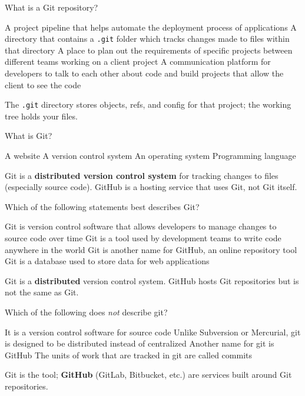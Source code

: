 \question[4]
What is a Git repository?
\begin{choices}
  \choice A project pipeline that helps automate the deployment process of applications
  \CorrectChoice A directory that contains a \texttt{.git} folder which tracks changes made to files within that directory
  \choice A place to plan out the requirements of specific projects between different teams working on a client project
  \choice A communication platform for developers to talk to each other about code and build projects that allow the client to see the code
\end{choices}
\begin{solution}
  The \texttt{.git} directory stores objects, refs, and config for that project; the working tree holds your files.
\end{solution}

\question[4]
What is Git?
\begin{choices}
  \choice A website
  \CorrectChoice A version control system
  \choice An operating system
  \choice Programming language
\end{choices}
\begin{solution}
  Git is a \textbf{distributed version control system} for tracking changes to files (especially source code). GitHub is a hosting service that uses Git, not Git itself.
\end{solution}

\question[4]
Which of the following statements best describes Git?
\begin{choices}
  \CorrectChoice Git is version control software that allows developers to manage changes to source code over time
  \choice Git is a tool used by development teams to write code anywhere in the world
  \choice Git is another name for GitHub, an online repository tool
  \choice Git is a database used to store data for web applications
\end{choices}
\begin{solution}
  Git is a \textbf{distributed} version control system. GitHub hosts Git repositories but is not the same as Git.
\end{solution}

\question[4]
Which of the following does \emph{not} describe git?
\begin{choices}
  \choice It is a version control software for source code
  \choice Unlike Subversion or Mercurial, git is designed to be distributed instead of centralized
  \CorrectChoice Another name for git is GitHub
  \choice The units of work that are tracked in git are called commits
\end{choices}
\begin{solution}
  Git is the tool; \textbf{GitHub} (GitLab, Bitbucket, etc.) are services built around Git repositories.
\end{solution}

